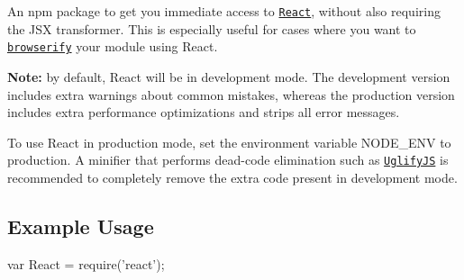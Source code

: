 An npm package to get you immediate access to \href{https://facebook.github.io/react/}{\tt React}, without also requiring the J\+SX transformer. This is especially useful for cases where you want to \href{https://github.com/substack/node-browserify}{\tt {\ttfamily browserify}} your module using {\ttfamily React}.

{\bfseries Note\+:} by default, React will be in development mode. The development version includes extra warnings about common mistakes, whereas the production version includes extra performance optimizations and strips all error messages.

To use React in production mode, set the environment variable {\ttfamily N\+O\+D\+E\+\_\+\+E\+NV} to {\ttfamily production}. A minifier that performs dead-\/code elimination such as \href{https://github.com/mishoo/UglifyJS2}{\tt Uglify\+JS} is recommended to completely remove the extra code present in development mode.

\subsection*{Example Usage}


\begin{DoxyCode}
var React = require('react');
\end{DoxyCode}
 